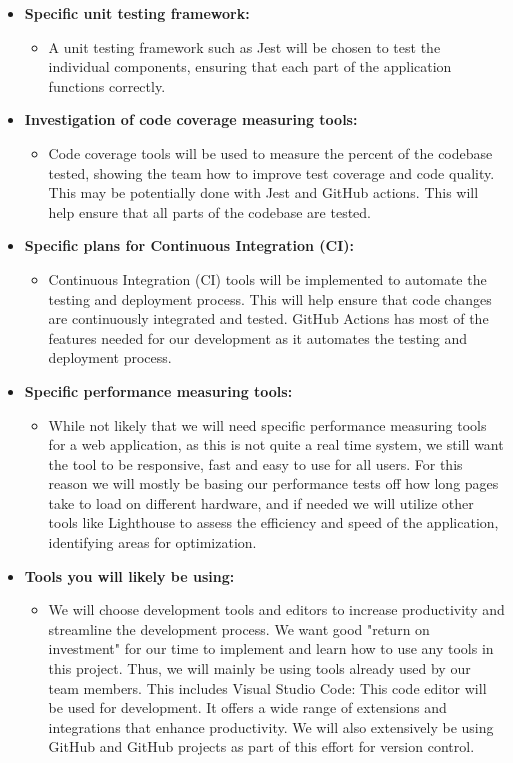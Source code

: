 \documentclass{article}
\begin{document}
\begin{itemize}
  \item \textbf{Specific unit testing framework:}
  \begin{itemize}
    \item  A unit testing framework such as Jest will be chosen to test the individual components, ensuring that each part of the application functions correctly.
  \end{itemize}

  \item \textbf{Investigation of code coverage measuring tools:}
  \begin{itemize}
    \item Code coverage tools will be used to measure the percent of the codebase tested, showing the team how to improve test coverage and code quality. This may be potentially done with Jest and GitHub actions. This will help ensure  that all parts of the codebase are tested.
  \end{itemize}

  \item \textbf{Specific plans for Continuous Integration (CI):}
  \begin{itemize}
    \item Continuous Integration (CI) tools will be implemented to automate the testing and deployment process. This will help ensure that code changes are continuously integrated and tested. GitHub Actions has most of the features needed for our development as it automates the testing and deployment process.
  \end{itemize}

  \item \textbf{Specific performance measuring tools:}
  \begin{itemize}
    \item While not likely that we will need specific performance measuring tools for a web application, as this is not quite a real time system, we still want the tool to be responsive, fast and easy to use for all users. For this reason we will mostly be basing our performance tests off how long pages take to load on different hardware, and if needed we will utilize other tools like Lighthouse to assess the efficiency and speed of the application, identifying areas for optimization.
  \end{itemize}

  \item \textbf{Tools you will likely be using:}
  \begin{itemize}
    \item We will choose development tools and editors to increase productivity and streamline the development process. We want good "return on investment" for our time to implement and learn how to use any tools in this project. Thus, we will mainly be using tools already used by our team members. This includes Visual Studio Code: This code editor will be used for development. It offers a wide range of extensions and integrations that enhance productivity. We will also extensively be using GitHub and GitHub projects as part of this effort for version control.
  \end{itemize}
\end{itemize}
\end{document}
